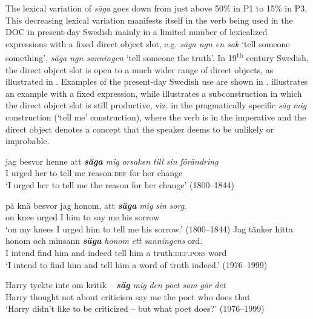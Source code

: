 \documentclass[output=paper]{langscibook}
\begin{document}
The lexical variation of \textit{säga} goes down from just above 50\% in P1 to 15\% in P3. This decreasing lexical variation manifests itself in the verb being used in the DOC in present-day Swedish mainly in a limited number of lexicalized expressions with a fixed direct object slot, e.g. \textit{säga ngn en sak} ‘tell someone something’, \textit{säga ngn sanningen} ‘tell someone the truth’. In 19\textsuperscript{th} century Swedish, the direct object slot is open to a much wider range of direct objects, as illustrated in . Examples of the present-day Swedish use are shown in .  illustrates an example with a fixed expression, while  illustrates a subconstruction in which the direct object slot is still productive, viz. in the pragmatically specific \textit{säg mig} construction (‘tell me’ construction), where the verb is in the imperative and the direct object denotes a concept that the speaker deems to be unlikely or improbable.\largerpage[-1]


\ea \label{ex:valdeson:14}
\ea
\gll jag besvor   henne  att \textbf{\textit{säga}} \textit{mig} \textit{orsaken}    \textit{till}     \textit{sin}  \textit{förändring}\\
      I      urged     her       to     tell   me  reason:\textsc{def} for     her     change\\
\glt  ‘I urged her to tell me the reason for her change’ (1800–1844)

\ex
\gll på    knä  besvor  jag  honom,  att \textbf{\textit{säga}} \textit{mig}   \textit{sin}   \textit{sorg}.\\
      on    knee   urged   I       him     to     say   me   his   sorrow\\
     \glt ‘on my knees I urged him to tell me his sorrow.’ (1800–1844)
\z
\ex \label{ex:valdeson:15}
\ea \label{ex:valdeson:15a}\gll Jag tänker hitta    honom    och  minsann \textbf{\textit{säga}} \textit{honom} \textit{ett}    \textit{sanningens}    ord.\\
      I      intend    find    him      and    indeed    tell      him a       truth:\textsc{def.poss}  word\\
\glt ‘I intend to find him and tell him a word of truth indeed.’ (1976–1999)

\ex \label{ex:valdeson:15b}\gll Harry  tyckte     inte  om    kritik  –  \textbf{\textit{säg}} \textit{mig}  \textit{den}  \textit{poet}  \textit{som}  \textit{gör}  \textit{det}  \\
        Harry    thought    not    about    criticism {} say   me    the    poet    who    does  that\\
\glt ‘Harry didn’t like to be criticized – but what poet does?’ (1976–1999)
\z
\z
\end{document}
